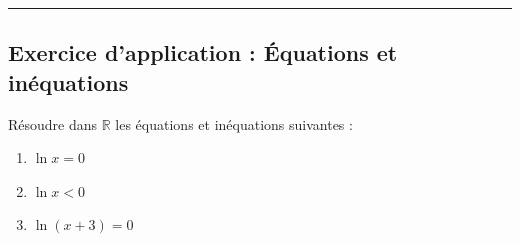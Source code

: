 \documentclass[12pt,a4paper]{article}
\begin{document}
\vspace{0.3cm}
\hrule
\vspace{0.3cm}

\subsection*{\color{myred}Exercice d'application : Équations et inéquations}

\begin{tcolorbox}[colback=yellow!5!white,colframe=myred,title=\textbf{Exercice d'application}]
Résoudre dans $\mathbb{R}$ les équations et inéquations suivantes :
\begin{enumerate}
    \item $\ln x = 0$
    \item $\ln x < 0$
    \item $\ln(x + 3) = 0$
\end{enumerate}
\end{tcolorbox}

\vspace{0.3cm}
\end{document}
